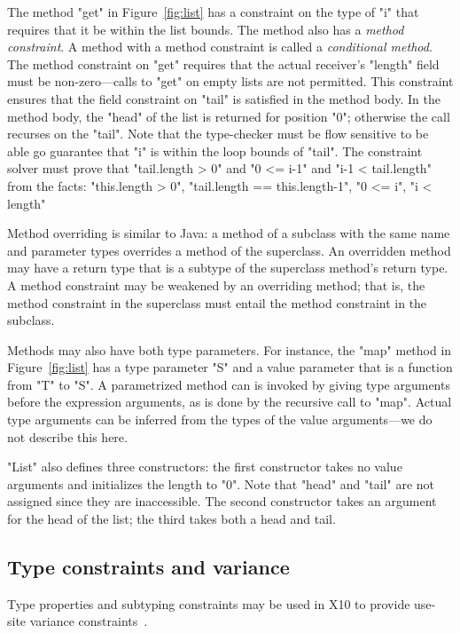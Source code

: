 The method \xcd"get" in Figure~\ref{fig:list}
has a constraint on the type of \xcd"i" that requires
that it be within the list bounds.
The method also has a \emph{method constraint}.
A method with a method constraint is called a \emph{conditional method}.
The method constraint on \xcd"get" requires that the actual
receiver's
\xcd"length" field must be non-zero---calls to \xcd"get" on empty lists are not
permitted.  This constraint ensures that the field constraint on
\xcd"tail" is satisfied in the method body.
In the method body, the \xcd"head" of the list is returned for
position \xcd"0"; otherwise the call recurses on the \xcd"tail".
Note that the type-checker must be flow sensitive to be able go
guarantee that \xcd"i" is within the loop bounds of \xcd"tail".
The constraint solver must prove that \xcd"tail.length > 0" and
\xcd"0 <= i-1" and \xcd"i-1 < tail.length" from the facts:
\xcd"this.length > 0", \xcd"tail.length == this.length-1",
\xcd"0 <= i", \xcd"i < length"

Method overriding is similar to Java: a method of a subclass
with the same name and parameter types overrides a method of the
superclass.  An overridden method may have a return type that is
a subtype of the superclass method's return type.
A method constraint may be weakened by an overriding
method; that is, the method constraint in the superclass must entail the  
method constraint in the subclass.

Methods may also have both type parameters.  
For instance, the \xcd"map" method in Figure~\ref{fig:list} 
has a type parameter \xcd"S" and a value parameter that is a
function from \xcd"T" to \xcd"S".
A parametrized method can is invoked by giving type arguments before the
expression arguments, as is done by the recursive call to
\xcd"map".  Actual type arguments can be inferred from the types
of the value arguments---we do not describe this here.

\xcd"List" also defines three constructors: the first
constructor takes no value arguments and initializes
the length to \xcd"0".  Note that \xcd"head" and \xcd"tail" are
not assigned since they are inaccessible.
The second constructor takes an argument for the head of the
list; the third takes both a head and tail.

\subsection{Type constraints and variance}
\label{sec:variance}

Type properties and subtyping constraints may be used in X10 to 
provide use-site variance
constraints~\cite{variant-parametric-types}.

